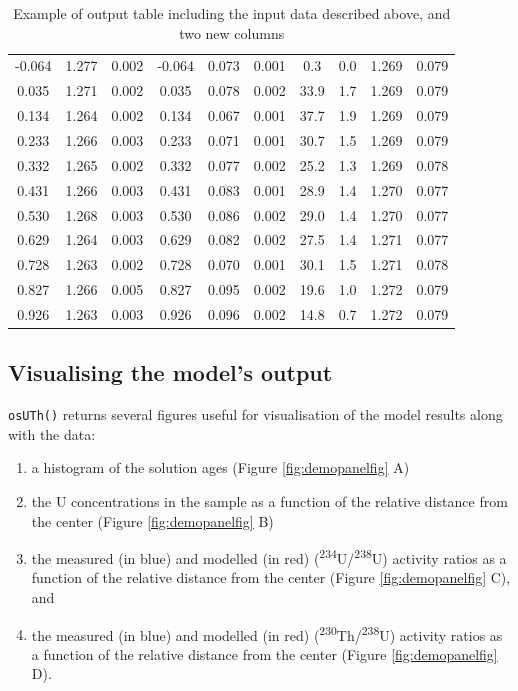 \documentclass[]{elsarticle} %
\providecommand{\tightlist}{%
  \setlength{\itemsep}{0pt}\setlength{\parskip}{0pt}}
\begin{document}
\begin{table}[ht]
\begin{tabular}{cccccccccc}
  -0.064 & 1.277 & 0.002 & -0.064 & 0.073 & 0.001 & 0.3 & 0.0 & 1.269 & 0.079 \\ 
  0.035 & 1.271 & 0.002 & 0.035 & 0.078 & 0.002 & 33.9 & 1.7 & 1.269 & 0.079 \\ 
  0.134 & 1.264 & 0.002 & 0.134 & 0.067 & 0.001 & 37.7 & 1.9 & 1.269 & 0.079 \\ 
  0.233 & 1.266 & 0.003 & 0.233 & 0.071 & 0.001 & 30.7 & 1.5 & 1.269 & 0.079 \\ 
  0.332 & 1.265 & 0.002 & 0.332 & 0.077 & 0.002 & 25.2 & 1.3 & 1.269 & 0.078 \\ 
  0.431 & 1.266 & 0.003 & 0.431 & 0.083 & 0.001 & 28.9 & 1.4 & 1.270 & 0.077 \\ 
  0.530 & 1.268 & 0.003 & 0.530 & 0.086 & 0.002 & 29.0 & 1.4 & 1.270 & 0.077 \\ 
  0.629 & 1.264 & 0.003 & 0.629 & 0.082 & 0.002 & 27.5 & 1.4 & 1.271 & 0.077 \\ 
  0.728 & 1.263 & 0.002 & 0.728 & 0.070 & 0.001 & 30.1 & 1.5 & 1.271 & 0.078 \\ 
  0.827 & 1.266 & 0.005 & 0.827 & 0.095 & 0.002 & 19.6 & 1.0 & 1.272 & 0.079 \\ 
  0.926 & 1.263 & 0.003 & 0.926 & 0.096 & 0.002 & 14.8 & 0.7 & 1.272 & 0.079 \\ 
   \hline
\end{tabular}
\caption{\label{tab:outputdata}Example of output table including the input data described above, and two new columns} 
\end{table}

\newpage

\hypertarget{visualising-the-models-output}{%
\subsection{Visualising the model's output}\label{visualising-the-models-output}}

\texttt{osUTh()} returns several figures useful for visualisation of the model results along with the data:

\begin{enumerate}
\def\labelenumi{\arabic{enumi}.}
\tightlist
\item
  a histogram of the solution ages (Figure \ref{fig:demopanelfig} A)
\item
  the U concentrations in the sample as a function of the relative distance from the center (Figure \ref{fig:demopanelfig} B)
\item
  the measured (in blue) and modelled (in red) (\textsuperscript{234}U/\textsuperscript{238}U) activity ratios as a function of the relative distance from the center (Figure \ref{fig:demopanelfig} C), and
\item
  the measured (in blue) and modelled (in red) (\textsuperscript{230}Th/\textsuperscript{238}U) activity ratios as a function of the relative distance from the center (Figure \ref{fig:demopanelfig} D).
\end{enumerate}
\end{document}
